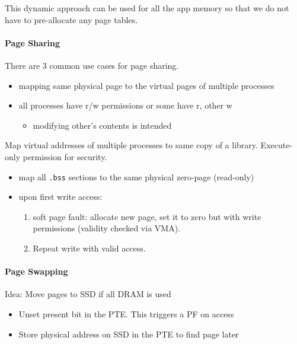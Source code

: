 \newpar{}

This dynamic approach can be used for all the app memory so that we do not have to pre-allocate any page tables.

\paragraph{Page Sharing}
There are 3 common use cases for page sharing.

\newpar{}

\begin{itemize}
    \item mapping same physical page to the virtual pages of multiple processes
    \item all processes have r/w permissions or some have r, other w
          \begin{itemize}
              \item modifying other's contents is intended
          \end{itemize}
\end{itemize}

\newpar{}

Map virtual addresses of multiple processes to same copy of a library. Execute-only permission for security.

\newpar{}

\begin{itemize}
    \item map all \texttt{.bss} sections to the same physical zero-page (read-only)
    \item upon first write access:
          \begin{enumerate}
              \item soft page fault: allocate new page, set it to zero but with write permissions (validity checked via VMA).
              \item Repeat write with valid access.
          \end{enumerate}
\end{itemize}

\paragraph{Page Swapping}
Idea: Move pages to SSD if all DRAM is used
\begin{itemize}
    \item Unset present bit in the PTE. This triggers a PF on access
    \item Store physical address on SSD in the PTE to find page later
\end{itemize}


